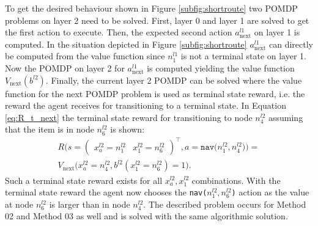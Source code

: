 To get the desired behaviour shown in Figure \ref{subfig:shortroute} two POMDP problems on layer 2 need to be solved. First, layer 0 and layer 1 are solved to get the first action to execute. Then, the expected second action $a_\text{next}^{l1}$ on layer 1 is computed. In the situation depicted in Figure \ref{subfig:shortroute} $a_\text{next}^{l1}$ can directly be computed from the value function since $n_1^{l1}$ is not a terminal state on layer 1. Now the  POMDP on layer 2 for $a_\text{next}^{l1}$ is computed yielding the value function $V_\text{next}(b^{l2})$. Finally, the current layer 2 POMDP can be solved where the value function for the next POMDP problem is used as terminal state reward, i.e. the reward the agent receives for transitioning to a terminal state. In Equation \ref{eq:R_t_next} the terminal state reward for transitioning to node $n_4^{l2}$ assuming that the item is in node $n_6^{l2}$ is shown:
\begin{multline}\label{eq:R_t_next}
    R\big( s=\begin{pmatrix} x_a^{l2}=n_1^{l2} & x_1^{l2}=n_6^{l2} \end{pmatrix}^\intercal, a=\texttt{nav($n_1^{l2}, n_4^{l2}$)} \big) = \\
    V_\text{next}\big( x_a^{l2}=n_4^{l2}, b^{l2}(x_1^{l2}=n_6^{l2})=1 \big).
\end{multline}
Such a terminal state reward exists for all $x_a^{l2}, x_1^{l2}$ combinations. With the terminal state reward the agent now chooses the \texttt{nav($n_1^{l2}, n_6^{l2}$)} action as the value at node $n_6^{l2}$ is larger than in node $n_4^{l2}$. The described problem occurs for Method 02 and Method 03 as well and is solved with the same algorithmic solution.\\
